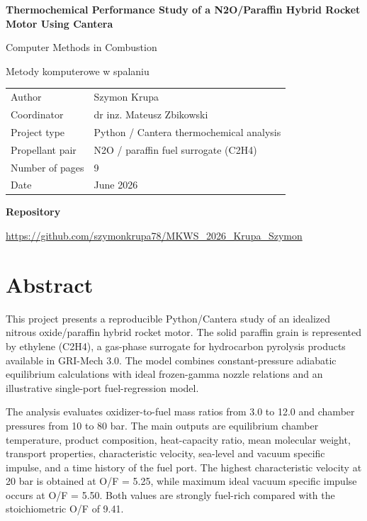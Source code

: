 \documentclass[10pt,a4paper]{article}
\begin{document}
\begin{titlepage}
\centering
\vspace*{2.2cm}
{\LARGE\bfseries Thermochemical Performance Study of a N2O/Paraffin Hybrid Rocket Motor Using Cantera\par}
\vspace{1cm}
{\large Computer Methods in Combustion\par}
{\large Metody komputerowe w spalaniu\par}
\vspace{1.8cm}
\begin{tabular}{ll}
\toprule
Author & Szymon Krupa \\
Coordinator & dr inz. Mateusz Zbikowski \\
Project type & Python / Cantera thermochemical analysis \\
Propellant pair & N2O / paraffin fuel surrogate (C2H4) \\
Number of pages & 9 \\
Date & June 2026 \\
\bottomrule
\end{tabular}
\vfill
\textbf{Repository}\par
\url{https://github.com/szymonkrupa78/MKWS_2026_Krupa_Szymon}
\end{titlepage}

\section*{Abstract}
This project presents a reproducible Python/Cantera study of an idealized nitrous oxide/paraffin hybrid rocket motor. The solid paraffin grain is represented by ethylene (C2H4), a gas-phase surrogate for hydrocarbon pyrolysis products available in GRI-Mech 3.0. The model combines constant-pressure adiabatic equilibrium calculations with ideal frozen-gamma nozzle relations and an illustrative single-port fuel-regression model.

The analysis evaluates oxidizer-to-fuel mass ratios from 3.0 to 12.0 and chamber pressures from 10 to 80 bar. The main outputs are equilibrium chamber temperature, product composition, heat-capacity ratio, mean molecular weight, transport properties, characteristic velocity, sea-level and vacuum specific impulse, and a time history of the fuel port. The highest characteristic velocity at 20 bar is obtained at O/F = 5.25, while maximum ideal vacuum specific impulse occurs at O/F = 5.50. Both values are strongly fuel-rich compared with the stoichiometric O/F of 9.41.
\end{document}
